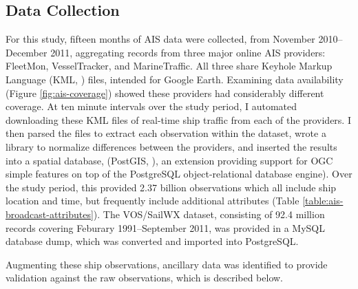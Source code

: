 \documentclass[12pt,letterpaper]{article}
\begin{document}
\subsection{Data Collection}

For this study, fifteen months of AIS data were collected, from November 2010--December 2011, aggregating records from three major online AIS providers: FleetMon, VesselTracker, and MarineTraffic. All three share Keyhole Markup Language (KML, \citeauthor{KML}) files, intended for Google Earth. Examining data availability (Figure \ref{fig:ais-coverage}) showed these providers had considerably different coverage. At ten minute intervals over the study period, I automated downloading these KML files of real-time ship traffic from each of the providers. I then parsed the files to extract each observation within the dataset, wrote a library to normalize differences between the providers, and inserted the results into a spatial database, (PostGIS, \citeauthor{ramsey2005postgis}), an extension providing support for OGC simple features \citep{OGCSimple} on top of the PostgreSQL \citep{postgresql} object-relational database engine). Over the study period, this provided 2.37 billion observations which all include ship location and time, but frequently include additional attributes (Table \ref{table:ais-broadcast-attributes}).  The VOS/SailWX dataset, consisting of 92.4 million records covering Feburary 1991--September 2011, was provided in a MySQL database dump, which was converted and imported into PostgreSQL. 

Augmenting these ship observations, ancillary data was identified to provide validation against the raw observations, which is described below.
\end{document}
